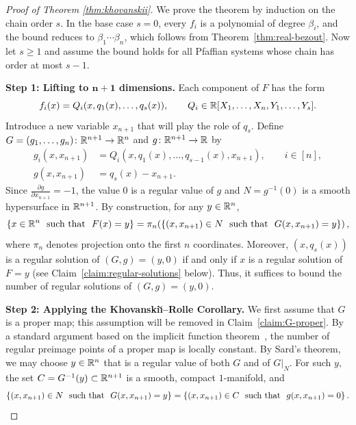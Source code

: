 \begin{proof}[Proof of Theorem \ref{thm:khovanskii}]
We prove the theorem by induction on the chain order $s$. In the base case $s=0$, every $f_i$ is a polynomial of degree $\beta_i$, and the bound reduces to $\beta_1 \dotsm \beta_n$, which follows from Theorem~\ref{thm:real-bezout}. Now let $s \ge 1$ and assume the bound holds for all Pfaffian systems whose chain has order at most $s-1$.

\medskip
\noindent\textbf{Step 1: Lifting to $\boldsymbol{n+1}$ dimensions.}
Each component of $F$ has the form
\begin{equation*}
  f_i(x) = Q_i(x, q_1(x), \ldots, q_s(x)), \qquad Q_i \in \mathbb{R}[X_1, \ldots, X_n, Y_1, \ldots, Y_s].
\end{equation*}
Introduce a new variable $x_{n+1}$ that will play the role of $q_s$. Define $G = (g_1, \ldots, g_n)\colon \mathbb{R}^{n+1} \to \mathbb{R}^n$ and $g\colon \mathbb{R}^{n+1} \to \mathbb{R}$ by
\begin{align*}
  g_i(x, x_{n+1}) &= Q_i(x, q_1(x), \ldots, q_{s-1}(x), x_{n+1}), \qquad i \in [n], \\
  g(x, x_{n+1}) &= q_s(x) - x_{n+1}.
\end{align*}
Since $\frac{\partial g}{\partial x_{n+1}} = -1$, the value $0$ is a regular value of $g$ and $N = g^{-1}(0)$ is a smooth hypersurface in $\mathbb{R}^{n+1}$. By construction, for any $y \in \mathbb{R}^n$,
\begin{equation} \label{eqn:counting-in-n+1}
  \left\{x \in \mathbb{R}^n \ \text{ such that }\  F(x) = y\right\} = \pi_n\!\left(\left\{(x, x_{n+1}) \in N \ \text{ such that }\  G(x, x_{n+1}) = y\right\}\right),
\end{equation}
where $\pi_n$ denotes projection onto the first $n$ coordinates. Moreover, $(x, q_s(x))$ is a regular solution of $(G, g) = (y, 0)$ if and only if $x$ is a regular solution of $F = y$ (see Claim~\ref{claim:regular-solutions} below). Thus, it suffices to bound the number of regular solutions of $(G, g) = (y, 0)$.

\medskip
\noindent\textbf{Step 2: Applying the Khovanski{\u\i}--Rolle Corollary.}
We first assume that $G$ is a proper map; this assumption will be removed in Claim~\ref{claim:G-proper}. By a standard argument based on the implicit function theorem~\cite[Chapter~1]{milnor1997topology}, the number of regular preimage points of a proper map is locally constant. By Sard's theorem, we may choose $y \in \mathbb{R}^n$ that is a regular value of both $G$ and of $G|_N$. For such $y$, the set $C = G^{-1}(y) \subset \mathbb{R}^{n+1}$ is a smooth, compact $1$-manifold, and
\begin{equation*}
  \left\{(x, x_{n+1}) \in N \ \text{ such that }\  G(x, x_{n+1}) = y\right\} = \left\{(x, x_{n+1}) \in C \ \text{ such that }\  g(x, x_{n+1}) = 0\right\}.
\end{equation*}


\end{proof}
